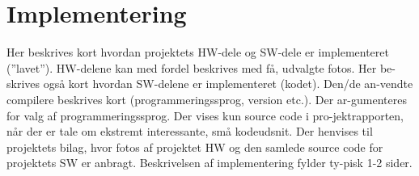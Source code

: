 \chapter{Implementering}\label{Implementering}
Her beskrives kort hvordan projektets HW-dele og SW-dele er implementeret (”lavet”). HW-delene kan med fordel beskrives med få, udvalgte fotos. Her be-skrives også kort hvordan SW-delene er implementeret (kodet). Den/de an-vendte compilere beskrives kort (programmeringssprog, version etc.). Der ar-gumenteres for valg af programmeringssprog. Der vises kun source code i pro-jektrapporten, når der er tale om ekstremt interessante, små kodeudsnit. Der henvises til projektets bilag, hvor fotos af projektet HW og den samlede source code for projektets SW er anbragt. Beskrivelsen af implementering fylder ty-pisk 1-2 sider.


